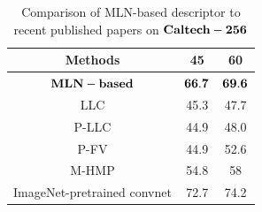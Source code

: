 \documentclass[journal]{IEEEtran}
\begin{document}
\begin{table}[!t]
\caption{Comparison of MLN-based descriptor to recent published papers on $\bf{Caltech-256}$}
\begin{center}
\begin{tabular}{|c|c|c|}
\hline
Methods & 45 & 60 \\
\hline
$\bf{MLN-based}$ & $\bf{66.7}$ & $\bf{69.6}$ \\
\hline
LLC &  45.3 & 47.7\\
\hline
P-LLC & 44.9 & 48.0\\
\hline
P-FV & 44.9 & 52.6\\
\hline
M-HMP & 54.8 & 58 \\
\hline
ImageNet-pretrained convnet & 72.7 & 74.2 \\
\hline
\end{tabular}
\end{center}
\end{table}
\end{document}
